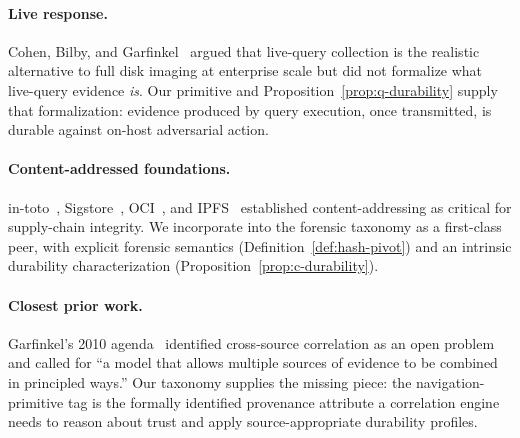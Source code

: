 \paragraph{Live response.}
Cohen, Bilby, and Garfinkel~\cite{cohen2011distributed} argued that
live-query collection is the realistic alternative to full disk imaging at
enterprise scale but did not formalize what live-query evidence \emph{is}.
Our  primitive and Proposition~\ref{prop:q-durability} supply that
formalization: evidence produced by query execution, once transmitted,
is durable against on-host adversarial action.

\paragraph{Content-addressed foundations.}
in-toto~\cite{torresarias2019intoto}, Sigstore~\cite{newman2022sigstore},
OCI~\cite{ociimagespec}, and IPFS~\cite{benet2014ipfs} established
content-addressing as critical for supply-chain integrity. We incorporate
 into the forensic taxonomy as a first-class peer, with explicit
forensic semantics (Definition~\ref{def:hash-pivot}) and an intrinsic
durability characterization (Proposition~\ref{prop:c-durability}).

\paragraph{Closest prior work.}
Garfinkel's 2010 agenda~\cite{garfinkel2010digital} identified cross-source
correlation as an open problem and called for ``a model that allows multiple
sources of evidence to be combined in principled ways.'' Our taxonomy
supplies the missing piece: the navigation-primitive tag is the formally
identified provenance attribute a correlation engine needs to reason about
trust and apply source-appropriate durability profiles.
